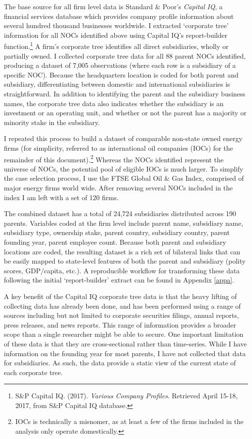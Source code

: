 \documentclass[11pt,]{book}
\begin{document}
The base source for all firm level data is Standard \& Poor's \emph{Capital IQ}, a financial services database which provides company profile information about several hundred thousand businesses worldwide. I extracted `corporate tree' information for all NOCs identified above using Capital IQ's report-builder function.\footnote{S\&P Capital IQ. (2017). \emph{Various Company Profiles}. Retrieved April 15-18, 2017, from S\&P Capital IQ database.} A firm's corporate tree identifies all direct subsidiaries, wholly or partially owned. I collected corporate tree data for all 88 parent NOCs identified, producing a dataset of 7,005 observations (where each row is a subsidiary of a specific NOC). Because the headquarters location is coded for both parent and subsidiary, differentiating between domestic and international subsidiaries is straightforward. In addition to identifying the parent and the subsidiary business names, the corporate tree data also indicates whether the subsidiary is an investment or an operating unit, and whether or not the parent has a majority or minority stake in the subsidiary.

I repeated this process to build a dataset of comparable non-state owned energy firms (for simplicity, referred to as international oil companies (IOCs) for the remainder of this document).\footnote{IOCs is technically a misnomer, as at least a few of the firms included in the analysis only operate domestically.} Whereas the NOCs identified represent the universe of NOCs, the potential pool of eligible IOCs is much larger. To simplify the case selection process, I use the FTSE Global Oil \& Gas Index, comprised of major energy firms world wide. After removing several NOCs included in the index I am left with a set of 120 firms.

The combined dataset has a total of 24,724 subsidiaries distributed across 190 parents. Variables coded at the firm level include parent name, subsidiary name, subsidiary type, ownership stake, parent country, subsidiary country, parent founding year, parent employee count. Because both parent and subsidiary locations are coded, the resulting dataset is a rich set of bilateral links that can be easily mapped to state-level features of both the parent and subsidiary (polity scores, GDP/capita, etc.). A reproducible workflow for transforming these data following the initial `report-builder' extract can be found in Appendix \ref{appa}.

A key benefit of the Capital IQ corporate tree data is that the heavy lifting of collecting data has already been done, and has been performed using a range of sources including but not limited to corporate securities filings, annual reports, press releases, and news reports. This range of information provides a broader scope than a single researcher might be able to secure. One important limitation of these data is that they are cross-sectional rather than time-series. While I have information on the founding year for most parents, I have not collected that data for subsidiaries. As such, the data provide a static view of the current state of each corporate tree.
\end{document}

